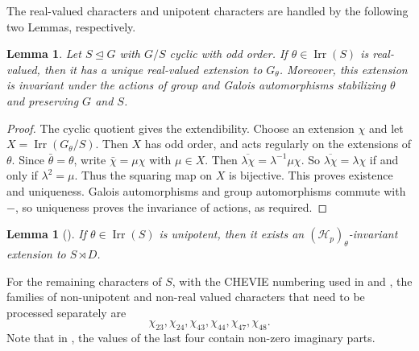 \documentclass[11pt,a4paper]{article}
\numberwithin{equation}{section}
\newtheorem{lemma}[theorem]{Lemma}
\theoremstyle{definition}
\theoremstyle{remark}
\newcommand{\Irr}{\operatorname{Irr}}
\newcommand{\HH}{\mathcal H}
\begin{document}
The real-valued characters and unipotent characters are handled by the following two Lemmas, respectively.
\begin{lemma}\label{lem:real}
Let $S\unlhd G$ with $G/S$ cyclic with odd order. If $\theta\in\Irr(S)$ is real-valued, then it has a unique real-valued extension to $G_\theta$. Moreover, this extension is invariant under the actions of group and Galois automorphisms stabilizing $\theta$ and preserving $G$ and $S$. 
\end{lemma}
\begin{proof}
The cyclic quotient gives the extendibility. Choose an extension $\chi$ and let $X=\Irr(G_\theta/S)$. Then $X$ has odd order, and acts regularly on the extensions of $\theta$. Since $\bar\theta=\theta$, write $\bar\chi=\mu\chi$ with $\mu\in X$. Then $\overline{\lambda\chi}=\lambda^{-1}\mu\chi$.
So $\overline{\lambda\chi}=\lambda\chi$ if and only if $\lambda^2=\mu$.
Thus the squaring map on $X$ is bijective. This proves existence and uniqueness. Galois automorphisms and group automorphisms commute with $-$, so uniqueness proves the invariance of actions, as required.
\end{proof}

\begin{lemma}[{\cite[Proposition~4.3]{Johansson}}]\label{lem:unipotent}
If $\theta\in\Irr(S)$ is unipotent, then it exists an $(\HH_p)_\theta$-invariant extension to $S\rtimes D$.  
\end{lemma}

For the remaining characters of $S$, with the CHEVIE numbering used in \cite[Table~A.2]{Himstedt} and \cite[Appendix~B]{HH}, the families of non-unipotent and non-real valued characters that need to be processed separately are
\begin{equation}\label{eq:six}
\chi_{23},\chi_{24},\chi_{43},\chi_{44},\chi_{47},\chi_{48}.
\end{equation}
Note that in \cite[Table~B.12]{HH}, the values of the last four contain non-zero imaginary parts. 
\end{document}
